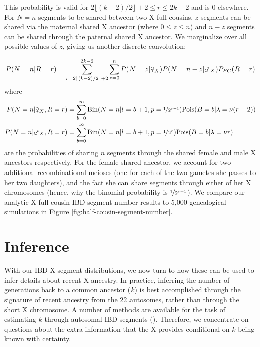 \documentclass[11pt]{article}
\newcommand{\msxa}{\mars_X}
\newcommand{\fsxa}{\venus_X}
\begin{document}
This probability is valid for $2\lfloor (k-2)/2 \rfloor + 2 \le r \le 2k-2$ and
is 0 elsewhere. For $N=n$ segments to be shared between two X full-cousins, $z$
segments can be shared via the maternal shared X ancestor (where $0 \le z \le n$)
and $n-z$ segments can be shared through the paternal shared X ancestor. We
marginalize over all possible values of $z$, giving us another discrete
convolution:

\begin{equation}
  \label{eq:prob-n-full-sibs}
  P(N = n | R=r) = \sum_{r=2\lfloor (k-2)/2\rfloor + 2}^{2k-2} \sum_{z=0}^{n} P(N = z | \fsxa) P(N = n - z | \msxa) P_{FC}(R=r)
\end{equation}
%
where
%
\begin{align}
  P(N = n | \fsxa, R=r) &= \sum_{b=0}^\infty \text{Bin}(N=n | l = b+1, p=\nicefrac{1}{2^{r+1}}) \text{Pois}(B=b | \lambda = \nu (r+2)) \\
  P(N = n | \msxa, R=r) &= \sum_{b=0}^\infty \text{Bin}(N=n | l = b+1, p=\nicefrac{1}{2^r}) \text{Pois}(B=b | \lambda = \nu r) 
\end{align}
%
are the probabilities of sharing $n$ segments through the shared female and
male X ancestors respectively. For the female shared ancestor, we account for
two additional recombinational meioses (one for each of the two gametes she
passes to her two daughters), and the fact she can share segments through
either of her X chromosomes (hence, why the binomial probability is
$\nicefrac{1}{2^{r+1}}$). We compare our analytic X full-cousin IBD segment
number results to 5,000 genealogical simulations in Figure
\ref{fig:half-cousin-segment-number}.

\section{Inference}
\label{sec:inf}

With our IBD X segment distributions, we now turn to how these can be used to
infer details about recent X ancestry. In practice, inferring the number of
generations back to a common ancestor ($k$) is best accomplished through the
signature of recent ancestry from the 22 autosomes, rather than through the
short X chromosome. A number of methods are available for the task of
estimating $k$ through autosomal IBD segments
(\cite{huff2011maximum,Henn:2012ij,Durand010512}).  Therefore, we concentrate
on questions about the extra information that the X provides conditional on $k$
being known with certainty. 
\end{document}
